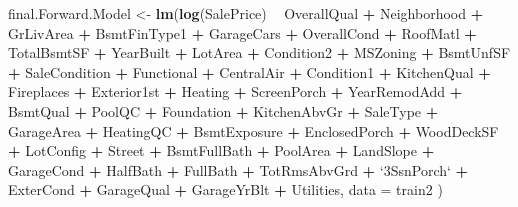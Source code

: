 \documentclass[american,]{article}
\newenvironment{Shaded}{\begin{snugshade}}{\end{snugshade}}
\newcommand{\DataTypeTok}[1]{\textcolor[rgb]{0.13,0.29,0.53}{#1}}
\newcommand{\KeywordTok}[1]{\textcolor[rgb]{0.13,0.29,0.53}{\textbf{#1}}}
\newcommand{\NormalTok}[1]{#1}
\newcommand{\OperatorTok}[1]{\textcolor[rgb]{0.81,0.36,0.00}{\textbf{#1}}}
\newcommand{\StringTok}[1]{\textcolor[rgb]{0.31,0.60,0.02}{#1}}
\theoremstyle{definition}
\theoremstyle{definition}
\theoremstyle{definition}
\theoremstyle{remark}
\begin{document}
\begin{Shaded}
\begin{Highlighting}[]
\NormalTok{final.Forward.Model <-}\StringTok{ }\KeywordTok{lm}\NormalTok{(}\KeywordTok{log}\NormalTok{(SalePrice) }\OperatorTok{~}\StringTok{ }\NormalTok{OverallQual }\OperatorTok{+}\StringTok{ }\NormalTok{Neighborhood }\OperatorTok{+}\StringTok{ }\NormalTok{GrLivArea }\OperatorTok{+}\StringTok{ }\NormalTok{BsmtFinType1 }\OperatorTok{+}\StringTok{ }
\StringTok{                  }\NormalTok{GarageCars }\OperatorTok{+}\StringTok{ }\NormalTok{OverallCond }\OperatorTok{+}\StringTok{ }\NormalTok{RoofMatl }\OperatorTok{+}\StringTok{ }\NormalTok{TotalBsmtSF }\OperatorTok{+}\StringTok{ }\NormalTok{YearBuilt }\OperatorTok{+}\StringTok{ }
\StringTok{                  }\NormalTok{LotArea }\OperatorTok{+}\StringTok{ }\NormalTok{Condition2 }\OperatorTok{+}\StringTok{ }\NormalTok{MSZoning }\OperatorTok{+}\StringTok{ }\NormalTok{BsmtUnfSF }\OperatorTok{+}\StringTok{ }\NormalTok{SaleCondition }\OperatorTok{+}\StringTok{ }
\StringTok{                  }\NormalTok{Functional }\OperatorTok{+}\StringTok{ }\NormalTok{CentralAir }\OperatorTok{+}\StringTok{ }\NormalTok{Condition1 }\OperatorTok{+}\StringTok{ }\NormalTok{KitchenQual }\OperatorTok{+}\StringTok{ }\NormalTok{Fireplaces }\OperatorTok{+}\StringTok{ }
\StringTok{                  }\NormalTok{Exterior1st }\OperatorTok{+}\StringTok{ }\NormalTok{Heating }\OperatorTok{+}\StringTok{ }\NormalTok{ScreenPorch }\OperatorTok{+}\StringTok{ }\NormalTok{YearRemodAdd }\OperatorTok{+}\StringTok{ }\NormalTok{BsmtQual }\OperatorTok{+}\StringTok{ }
\StringTok{                  }\NormalTok{PoolQC }\OperatorTok{+}\StringTok{ }\NormalTok{Foundation }\OperatorTok{+}\StringTok{ }\NormalTok{KitchenAbvGr }\OperatorTok{+}\StringTok{ }\NormalTok{SaleType }\OperatorTok{+}\StringTok{ }\NormalTok{GarageArea }\OperatorTok{+}\StringTok{ }
\StringTok{                  }\NormalTok{HeatingQC }\OperatorTok{+}\StringTok{ }\NormalTok{BsmtExposure }\OperatorTok{+}\StringTok{ }\NormalTok{EnclosedPorch }\OperatorTok{+}\StringTok{ }\NormalTok{WoodDeckSF }\OperatorTok{+}\StringTok{ }\NormalTok{LotConfig }\OperatorTok{+}\StringTok{ }
\StringTok{                  }\NormalTok{Street }\OperatorTok{+}\StringTok{ }\NormalTok{BsmtFullBath }\OperatorTok{+}\StringTok{ }\NormalTok{PoolArea }\OperatorTok{+}\StringTok{ }\NormalTok{LandSlope }\OperatorTok{+}\StringTok{ }\NormalTok{GarageCond }\OperatorTok{+}\StringTok{ }
\StringTok{                  }\NormalTok{HalfBath }\OperatorTok{+}\StringTok{ }\NormalTok{FullBath }\OperatorTok{+}\StringTok{ }\NormalTok{TotRmsAbvGrd }\OperatorTok{+}\StringTok{ `}\DataTypeTok{3SsnPorch}\StringTok{`} \OperatorTok{+}\StringTok{ }\NormalTok{ExterCond }\OperatorTok{+}\StringTok{ }
\StringTok{                  }\NormalTok{GarageQual }\OperatorTok{+}\StringTok{ }\NormalTok{GarageYrBlt }\OperatorTok{+}\StringTok{ }\NormalTok{Utilities, }\DataTypeTok{data =}\NormalTok{ train2}
\NormalTok{                  )}
\end{Highlighting}
\end{Shaded}
\end{document}
